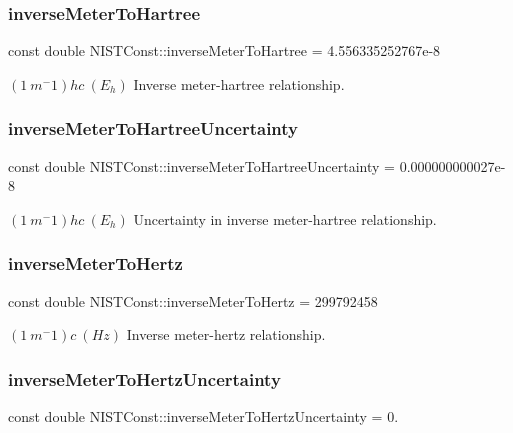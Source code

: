 \subsubsection{\texorpdfstring{inverse\+Meter\+To\+Hartree}{inverseMeterToHartree}}
{\footnotesize\ttfamily const double N\+I\+S\+T\+Const\+::inverse\+Meter\+To\+Hartree = 4.\+556335252767e-\/8}

$(1\ m^-1)hc \ (E_h)$ Inverse meter-\/hartree relationship. \mbox{\label{group___n_i_s_t_const-_inverse_meter_gac31d4508dcf24c9b18d914aa6f8760a1}} 
\subsubsection{\texorpdfstring{inverse\+Meter\+To\+Hartree\+Uncertainty}{inverseMeterToHartreeUncertainty}}
{\footnotesize\ttfamily const double N\+I\+S\+T\+Const\+::inverse\+Meter\+To\+Hartree\+Uncertainty = 0.\+000000000027e-\/8}

$(1\ m^-1)hc \ (E_h)$ Uncertainty in inverse meter-\/hartree relationship. \mbox{\label{group___n_i_s_t_const-_inverse_meter_ga5743c27316774c4f065336d0a016508e}} 
\subsubsection{\texorpdfstring{inverse\+Meter\+To\+Hertz}{inverseMeterToHertz}}
{\footnotesize\ttfamily const double N\+I\+S\+T\+Const\+::inverse\+Meter\+To\+Hertz = 299792458}

$(1\ m^-1)c \ (Hz)$ Inverse meter-\/hertz relationship. \mbox{\label{group___n_i_s_t_const-_inverse_meter_ga96ba9736f99affda3bf53cb99bda10b0}} 
\subsubsection{\texorpdfstring{inverse\+Meter\+To\+Hertz\+Uncertainty}{inverseMeterToHertzUncertainty}}
{\footnotesize\ttfamily const double N\+I\+S\+T\+Const\+::inverse\+Meter\+To\+Hertz\+Uncertainty = 0.}

